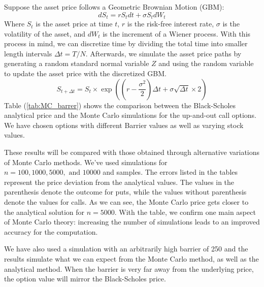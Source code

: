 Suppose the asset price follows a Geometric Brownian Motion (GBM):
\begin{equation}\label{eq:GBM}
	dS_t=rS_tdt+\sigma S_tdW_t
\end{equation}
Where $S_t$ is the asset price at time $t$, $r$ is the risk-free interest rate, $\sigma$ is the volatility of the asset, and $dW_t$ is the increment of a Wiener process. With this process in mind, we can discretize time by dividing the total time into smaller length intervals $\Delta t=T/N.$ Afterwards, we simulate the asset price paths by generating a random standard normal variable $Z$ and using the random variable to update the asset price with the discretized GBM.
\begin{equation}
	S_{t+\Delta t}=S_t\times\exp\left(\left(r-\frac{\sigma^2}{2}\right)\Delta t+\sigma\sqrt{\Delta t}\times 2\right)
\end{equation}
Table (\ref{tab:MC_barrer}) shows the comparison between the Black-Scholes analytical price and the Monte Carlo simulations for the up-and-out call options. We have chosen options with different Barrier values as well as varying stock values.

These results will be compared with those obtained through alternative variations of Monte Carlo methods. We've used simulations for $n=100,1000,5000,\text{ and }10000$ and samples. The errors listed in the tables represent the price deviation from the analytical values. The values in the parenthesis denote the outcome for puts, while the values without parenthesis denote the values for calls. As we can see, the Monte Carlo price gets closer to the analytical solution for $n=5000$. With the table, we confirm one main aspect of Monte Carlo theory: increasing the number of simulations leads to an improved accuracy for the computation. 

We have also used a simulation with an arbitrarily high barrier of 250 and the results simulate what we can expect from the Monte Carlo method, as well as the analytical method. When the barrier is very far away from the underlying price, the option value will mirror the Black-Scholes price.
